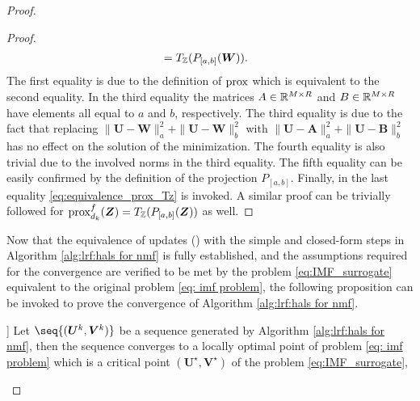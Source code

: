 \begin{proof}
\begin{proof}
\begin{align*}
            &= T_\mathbb Z(P_{[a,b]}(\bm W)).
        \end{align*}
        The first equality is due to the definition of $\operatorname{prox}$ which is equivalent to the second equality. 
        In the third equality the matrices $A\in\mathbb{R}^{M\times R}$ and $B\in\mathbb{R}^{M\times R}$ have elements all equal to $a$ and $b$, respectively.
        The third equality is due to the fact that replacing $\|\bm U - \bm W\|^2_a + \|\bm U - \bm W\|^2_b$ with $\|\bm U - \bm A\|^2_a + \|\bm U - \bm B\|^2_b$ has no effect on the solution of the minimization. The fourth equality is also trivial due to the involved norms in the third equality. The fifth equality can be easily confirmed by the definition of the projection $P_{[a,b]}$. Finally, in the last equality \eqref{eq:equivalence_prox_Tz} is invoked. A similar proof can be trivially followed for $\operatorname{prox}^f_{d_k}(\bm Z) = T_\mathbb Z(P_{[a,b]}(\bm Z))$ as well.
    \end{proof}
    Now that the equivalence of updates () with the simple and closed-form steps in Algorithm \ref{alg:lrf:hals for nmf} is fully established, and the assumptions required for the convergence are verified to be met by the problem \eqref{eq:IMF_surrogate} equivalent to the original problem \eqref{eq: imf problem}, the following proposition can be invoked to prove the convergence of Algorithm \ref{alg:lrf:hals for nmf}.
    \begin{prop}[Global convergence []]
        Let $\seq{(\bm U^k, \bm V^k)}$ be a sequence generated by Algorithm \ref{alg:lrf:hals for nmf}, then
        the sequence converges to a locally optimal point of problem \eqref{eq: imf problem} which is a critical point $(\bm U^\star, \bm V^\star)$ of the problem \eqref{eq:IMF_surrogate},
    \end{prop}
    




\end{proof}